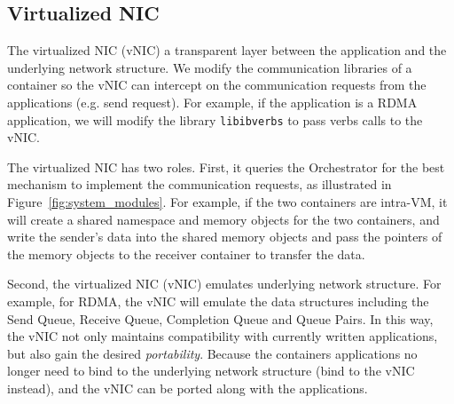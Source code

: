 \subsection{Virtualized NIC}
The virtualized NIC (vNIC) a transparent layer between the application and the underlying network structure.
We modify the communication libraries of a container so the vNIC can intercept on the communication requests
from the applications (e.g. send request). For example, if the application is a RDMA application, we
will modify the library \texttt{libibverbs} to pass verbs calls to the vNIC.

The virtualized NIC has two roles. First, it queries the Orchestrator for the best mechanism to implement the 
communication requests, as illustrated in Figure~\ref{fig:system_modules}.
For example, if the two containers are intra-VM, it will create a shared namespace and memory objects 
for the two containers, and write the sender's data into the shared memory objects and pass the pointers of the
memory objects to the receiver container to transfer the data.

Second, the virtualized NIC (vNIC) emulates underlying network structure. 
For example, for RDMA, the vNIC will emulate the data structures including the Send Queue, 
Receive Queue, Completion Queue and Queue Pairs.
In this way, the vNIC not only maintains compatibility with currently written applications, but also
gain the desired \emph{portability}. Because the containers applications no longer need to bind to
the underlying network structure (bind to the vNIC instead), and the vNIC can be ported along with
the applications.





